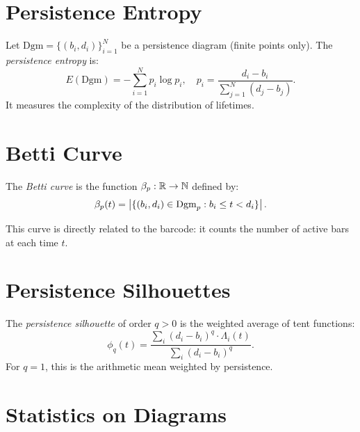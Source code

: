 \section{Persistence Entropy}

\begin{definition}
Let $\mathrm{Dgm} = \{(b_i, d_i)\}_{i=1}^N$ be a persistence diagram
(finite points only). The \emph{persistence entropy} is:
\[
  E(\mathrm{Dgm}) = -\sum_{i=1}^{N} p_i \log p_i, \quad
  p_i = \frac{d_i - b_i}{\sum_{j=1}^N (d_j - b_j)}.
\]
It measures the complexity of the distribution of lifetimes.
\end{definition}

\section{Betti Curve}

\begin{definition}
The \emph{Betti curve} is the function $\beta_p : \mathbb{R} \to \mathbb{N}$ defined by:
\[
  \beta_p(t) = \left| \{(b_i, d_i) \in \mathrm{Dgm}_p : b_i \leq t < d_i\} \right|.
\]
\end{definition}

This curve is directly related to the barcode: it counts the number of
active bars at each time $t$.

\section{Persistence Silhouettes}

\begin{definition}
The \emph{persistence silhouette} of order $q > 0$ is the weighted
average of tent functions:
\[
  \phi_q(t) = \frac{\sum_i (d_i - b_i)^q \cdot \Lambda_i(t)}
  {\sum_i (d_i - b_i)^q}.
\]
For $q = 1$, this is the arithmetic mean weighted by persistence.
\end{definition}

\section{Statistics on Diagrams}

